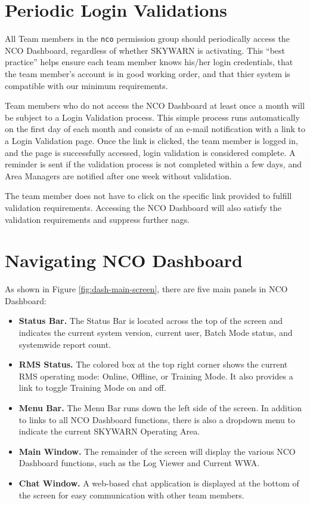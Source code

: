 \documentclass[pdflatex,letterpaper,twoside,12pt]{book}
\begin{document}

\section{Periodic Login Validations}

All Team members in the \texttt{nco} permission group should periodically access the NCO Dashboard, regardless of whether SKYWARN is activating.  This ``best practice'' helps ensure each team member knows his/her login credentials, that the team member's account is in good working order, and that thier system is compatible with our minimum requirements.

Team members who do not access the NCO Dashboard at least once a month will be subject to a Login Validation process.  This simple process runs automatically on the first day of each month and consists of an e-mail notification with a link to a Login Validation page.  Once the link is clicked, the team member is logged in, and the page is successfully accessed, login validation is considered complete.  A reminder is sent if the validation process is not completed within a few days, and Area Managers are notified after one week without validation.

The team member does not have to click on the specific link provided to fulfill validation requirements.  Accessing the NCO Dashboard will also satisfy the validation requirements and suppress further nags.


\section{Navigating NCO Dashboard}

As shown in Figure \ref{fig:dash-main-screen}, there are five main panels in NCO Dashboard:

\begin{itemize}
\item \textbf{Status Bar.} The Status Bar is located across the top of the screen and indicates the current system version, current user, Batch Mode status, and systemwide report count.
\item \textbf{RMS Status.}  The colored box at the top right corner shows the current RMS operating mode:  Online, Offline, or Training Mode.  It also provides a link to toggle Training Mode on and off.
\item \textbf{Menu Bar.}  The Menu Bar runs down the left side of the screen.  In addition to links to all NCO Dashboard functions, there is also a dropdown menu to indicate the current SKYWARN Operating Area.
\item \textbf{Main Window.}  The remainder of the screen will display the various NCO Dashboard functions, such as the Log Viewer and Current WWA.
\item \textbf{Chat Window.}  A web-based chat application is displayed at the bottom of the screen for easy communication with other team members.
\end{itemize}
\end{document}

